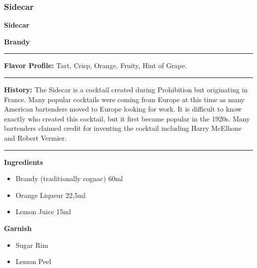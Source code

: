\subsubsection{Sidecar}
\noindent
\begin{minipage}{.49\textwidth}
    \noindent\textbf{\LARGE Sidecar}
\end{minipage}
\hspace{.02\textwidth}
\begin{minipage}{.49\textwidth}
    \raggedleft
    \textbf{\large Brandy}\\
\end{minipage}
\vspace{.5em}\hrule\vspace{.5em}
\noindent
\textbf{\large Flavor Profile:} Tart, Crisp, Orange, Fruity, Hint of Grape.
\vspace{.5em}\hrule\vspace{.5em}
\noindent
\textbf{\large History:} The Sidecar is a cocktail created during Prohibition but originating in France. Many popular cocktails were coming from Europe at this time as many American bartenders moved to Europe looking for work. It is difficult to know exactly who created this cocktail, but it first became popular in the 1920s. Many bartenders claimed credit for inventing the cocktail including Harry McElhone and Robert Vermier.
\vspace{.5em}\hrule\vspace{.5em}
\noindent
\begin{minipage}[t]{.49\textwidth}
    \noindent
    \textbf{\large Ingredients}
    \begin{itemize}
        \item Brandy (traditionally cognac) 60ml
        \item Orange Liqueur 22,5ml
        \item Lemon Juice 15ml
    \end{itemize}
    \noindent
    \textbf{\large Garnish}
    \begin{itemize}
        \item Sugar Rim
        \item Lemon Peel
    \end{itemize}
\end{minipage}
